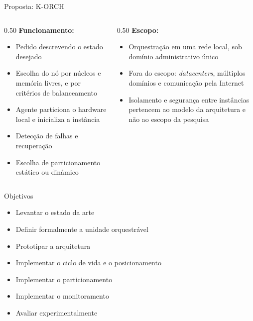 \documentclass[aspectratio=169]{beamer}
\begin{document}
{        \begin{frame}{Proposta: K-ORCH}
            \begin{columns}[T]
                \begin{column}{0.50\textwidth}
                    \textbf{Funcionamento:}
                    \setlength{\leftmargini}{1em}
                    \begin{itemize}
                        \item Pedido descrevendo o estado desejado
                        \item Escolha do nó por núcleos e memória livres, e por critérios de balanceamento
                        \item Agente particiona o hardware local e inicializa a instância
                        \item Detecção de falhas e recuperação
                        \item Escolha de particionamento estático ou dinâmico
                    \end{itemize}
                \end{column}
                \begin{column}{0.50\textwidth}
                    \textbf{Escopo:}
                    \setlength{\leftmargini}{1em}
                    \begin{itemize}
                        \item Orquestração em uma rede local, sob domínio administrativo único
                        \item Fora do escopo: \textit{datacenters}, múltiplos domínios e comunicação pela Internet
                        \item Isolamento e segurança entre instâncias pertencem ao modelo da arquitetura e não ao escopo da pesquisa
                    \end{itemize}
                \end{column}
            \end{columns}
        \end{frame}

        \begin{frame}{Objetivos}
            \begin{itemize}
                \item Levantar o estado da arte
                \item Definir formalmente a unidade orquestrável
                \item Prototipar a arquitetura
                \item Implementar o ciclo de vida e o posicionamento
                \item Implementar o particionamento
                \item Implementar o monitoramento
                \item Avaliar experimentalmente
            \end{itemize}
        \end{frame}

}
\end{document}
